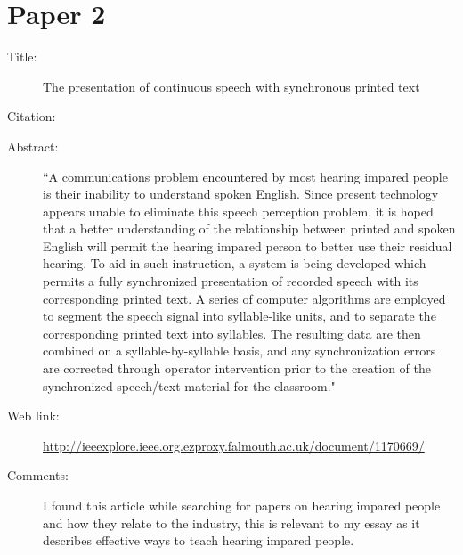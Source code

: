 \documentclass{scrartcl}
\begin{document}
\section*{Paper 2}
\begin{description}
\item[Title:] The presentation of continuous speech with synchronous printed text
\item[Citation:] \cite{Sargent}
\item[Abstract:] ``A communications problem encountered by most hearing impared people is their inability to understand spoken English. Since present technology appears unable to eliminate this speech perception problem, it is hoped that a better understanding of the relationship between printed and spoken English will permit the hearing impared person to better use their residual hearing. To aid in such instruction, a system is being developed which permits a fully synchronized presentation of recorded speech with its corresponding printed text. A series of computer algorithms are employed to segment the speech signal into syllable-like units, and to separate the corresponding printed text into syllables. The resulting data are then combined on a syllable-by-syllable basis, and any synchronization errors are corrected through operator intervention prior to the creation of the synchronized speech/text material for the classroom."
\item[Web link:] \url{http://ieeexplore.ieee.org.ezproxy.falmouth.ac.uk/document/1170669/}
\item[Comments:] I found this article while searching for papers on hearing impared people and how they relate to the industry, this is relevant to my essay as it describes effective ways to teach hearing impared people.
\end{description}
\end{document}
